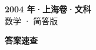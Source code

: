 \documentclass[zihao=-4, a4paper]{ctexart}
\begin{document}
\begin{center}
  {\Large\bfseries 2004 年·上海卷·文科}\\[4pt]
  {\large 数学 · 简答版}
\end{center}
\medskip
{}

\clearpage
{}
\begin{center}{\Large\bfseries 答案速查}\end{center}
\medskip

\end{document}
